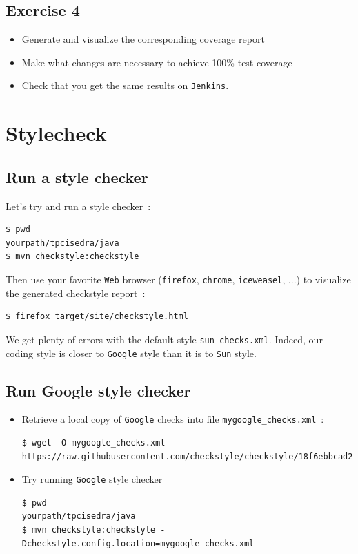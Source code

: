 \documentclass{article}
\begin{document}
\subsection{Exercise 4}
\begin{itemize}
\item Generate and visualize the corresponding coverage report
\item Make what changes are necessary to achieve 100\% test coverage
\item Check that you get the same results on \texttt{Jenkins}.
\end{itemize}

\section{Stylecheck}

\subsection{Run a style checker}

Let's try and run a style checker~:
\begin{lstlisting}
$ pwd
yourpath/tpcisedra/java
$ mvn checkstyle:checkstyle
\end{lstlisting}

Then use your favorite \texttt{Web} browser (\texttt{firefox}, \texttt{chrome}, \texttt{iceweasel}, ...) to visualize the generated checkstyle report~:
\begin{lstlisting}
$ firefox target/site/checkstyle.html
\end{lstlisting}

We get plenty of errors with the default style \texttt{sun\_checks.xml}.
Indeed, our coding style is closer to \texttt{Google} style than it is to \texttt{Sun} style.

\subsection{Run Google style checker}

\begin{itemize}
\item Retrieve a local copy of \texttt{Google} checks into file \texttt{mygoogle\_checks.xml}~:
\begin{lstlisting}[breaklines=true]
$ wget -O mygoogle_checks.xml https://raw.githubusercontent.com/checkstyle/checkstyle/18f6ebbcad23e88e3ae30fc79be464b8b7772a0d/google_checks.xml
\end{lstlisting}
\item Try running \texttt{Google} style checker
\begin{lstlisting}
$ pwd
yourpath/tpcisedra/java
$ mvn checkstyle:checkstyle -Dcheckstyle.config.location=mygoogle_checks.xml
\end{lstlisting}
\end{itemize}
\end{document}

